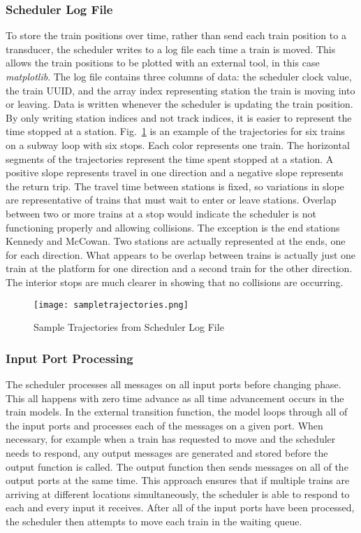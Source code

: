 \subsubsection{Scheduler Log File}
To store the train positions over time, rather than send each train position to a transducer, the scheduler writes to a log file each time a train is moved. This allows the train positions to be plotted with an external tool, in this case \textit{matplotlib}.  The log file contains three columns of data: the scheduler clock value, the train UUID, and the array index representing station the train is moving into or leaving.  Data is written whenever the scheduler is updating the train position.  By only writing station indices and not track indices, it is easier to represent the time stopped at a station.  Fig.~\ref{fig:sampletrajectories} is an example of the trajectories for six trains on a subway loop with six stops.  Each color represents one train.  The horizontal segments of the trajectories represent the time spent stopped at a station. A positive slope represents travel in one direction and a negative slope represents the return trip. The travel time between stations is fixed, so variations in slope are representative of trains that must wait to enter or leave stations.  Overlap between two or more trains at a stop would indicate the scheduler is not functioning properly and allowing collisions.  The exception is the end stations Kennedy and McCowan.  Two stations are actually represented at the ends, one for each direction.  What appears to be overlap between trains is actually just one train at the platform for one direction and a second train for the other direction.  The interior stops are much clearer in showing that no collisions are occurring.  
%
\begin{figure}[htb]
	\centering
	\texttt{[image: sampletrajectories.png]}
	\caption{Sample Trajectories from Scheduler Log File}
	\label{fig:sampletrajectories}
\end{figure}

\subsubsection{Input Port Processing}
The scheduler processes all messages on all input ports before changing phase.  This all happens with zero time advance as all time advancement occurs in the train models.  In the external transition function, the model loops through all of the input ports and processes each of the messages on a given port.  When necessary, for example when a train has requested to move and the scheduler needs to respond, any output messages are generated and stored before the output function is called.  The output function then sends messages on all of the output ports at the same time.  This approach ensures that if multiple trains are arriving at different locations simultaneously, the scheduler is able to respond to each and every input it receives.  After all of the input ports have been processed, the scheduler then attempts to move each train in the waiting queue.

